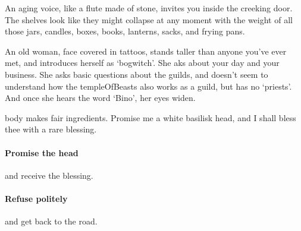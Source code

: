 An aging voice, like a flute made of stone, invites you inside the creeking door.
The shelves look like they might collapse at any moment with the weight of all those jars, candles, boxes, books, lanterns, sacks, and frying pans.

An old woman, face covered in tattoos, stands taller than anyone you've ever met, and introduces herself as `\gls{bogwitch}'.
She aks about your day and your business.
She asks basic questions about the guilds, and doesn't seem to understand how the \gls{templeOfBeasts} also works as a guild, but has no `priests'.
And once she hears the word `Bino', her eyes widen.

\begin{speechtext}
   body makes fair \glspl{ingredient}.
  Promise me a white \gls{basilisk} head, and I shall bless thee with a rare blessing.
\end{speechtext}

\paragraph{Promise the head}
and receive the blessing.

\paragraph{Refuse politely}
and get back to the road.

